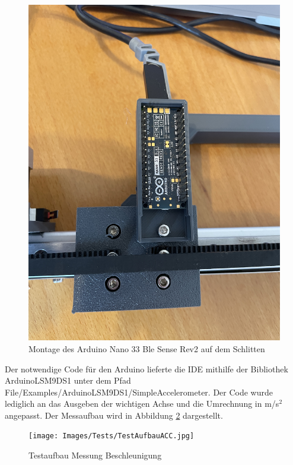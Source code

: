 \begin{figure}[H]
	\begin{center}
		\includegraphics[width=\textwidth]{Images/Tests/ArdRev2Schlitten.jpg}
		\caption{Montage des Arduino Nano 33 Ble Sense Rev2 auf dem Schlitten} \label{ArdRev2Schlitten}
	\end{center}
\end{figure} 

Der notwendige Code für den Arduino lieferte die IDE mithilfe der Bibliothek ArduinoLSM9DS1 unter dem Pfad File/Examples/ArduinoLSM9DS1/SimpleAccelerometer. Der Code wurde lediglich an das Ausgeben der wichtigen Achse und die Umrechnung in m/s$^2$ angepasst. Der Messaufbau wird in Abbildung \ref{TestAuffbauACC} dargestellt. 

\begin{figure}[H]
	\begin{center}
		\texttt{[image: Images/Tests/TestAufbauACC.jpg]}
		\caption{Testaufbau Messung Beschleunigung} \label{TestAuffbauACC}
	\end{center}
	\end{figure} 


